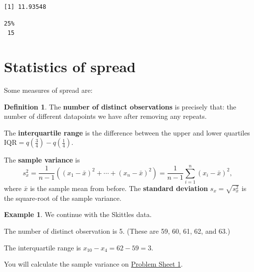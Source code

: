 \documentclass[
  a4paper,
]{book}
\newenvironment{Shaded}{\begin{snugshade}}{\end{snugshade}}
\newcommand{\AttributeTok}[1]{\textcolor[rgb]{0.13,0.29,0.53}{#1}}
\newcommand{\DecValTok}[1]{\textcolor[rgb]{0.00,0.00,0.81}{#1}}
\newcommand{\FunctionTok}[1]{\textcolor[rgb]{0.13,0.29,0.53}{\textbf{#1}}}
\newcommand{\NormalTok}[1]{#1}
\newcommand{\SpecialCharTok}[1]{\textcolor[rgb]{0.81,0.36,0.00}{\textbf{#1}}}
\theoremstyle{definition}
\newtheorem{definition}{Definition}[chapter]
\theoremstyle{definition}
\newtheorem{example}{Example}[chapter]
\theoremstyle{definition}
\theoremstyle{definition}
\theoremstyle{remark}
\begin{document}
\begin{verbatim}
[1] 11.93548
\end{verbatim}

\begin{Shaded}
\end{Shaded}

\begin{verbatim}
25% 
 15 
\end{verbatim}

\hypertarget{stat-spread}{%
\section{Statistics of spread}\label{stat-spread}}

Some measures of spread are:

\begin{definition}
The \textbf{number of distinct observations} is precisely that: the number of different datapoints we have after removing any repeats.

The \textbf{interquartile range} is the difference between the upper and lower quartiles \(\text{IQR} = q(\frac34) - q(\frac14)\).

The \textbf{sample variance} is
\[  s^2_x = \frac{1}{n-1} \left((x_1 - \bar x)^2 + \cdots + (x_n - \bar x)^2 \right) = \frac{1}{n-1} \sum_{i=1}^n (x_i - \bar x)^2 , \]
where \(\bar x\) is the sample mean from before. The \textbf{standard deviation} \(s_x = \sqrt{s^2_x}\) is the square-root of the sample variance.
\end{definition}

\begin{example}
We continue with the Skittles data.

The number of distinct observation is 5. (These are 59, 60, 61, 62, and 63.)

The interquartile range is \(x_{10} - x_4 = 62 - 59 = 3\).

You will calculate the sample variance on \protect\hyperlink{P1}{Problem Sheet 1}.
\end{example}
\end{document}
